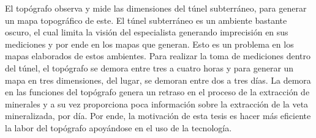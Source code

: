El topógrafo observa y mide las dimensiones del túnel subterráneo, para generar un mapa 
topográfico de este. El túnel subterráneo es un ambiente bastante oscuro, el 
cual limita la visión del especialista generando imprecisión en sus mediciones y por ende en 
los mapas que generan. Esto es un problema en los mapas elaborados de estos ambientes. Para 
realizar la toma de mediciones dentro del túnel, el topógrafo se demora entre tres a cuatro 
horas y para generar un mapa en tres dimensiones, del lugar, se demoran entre dos a tres 
días. La demora en las funciones del topógrafo genera un retraso en el proceso de la extracción 
de minerales y a su vez proporciona poca información sobre la extracción de la veta 
mineralizada, por día. Por ende, la motivación de esta tesis es hacer más eficiente la 
labor del topógrafo apoyándose en el uso de la tecnología. 





